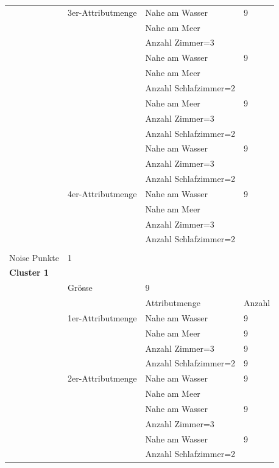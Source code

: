 \begin{longtable}{ | l | l | l | l |}
	& 3er-Attributmenge & \tabitem Nahe am Wasser & 9 \\
	& & \tabitem Nahe am Meer & \\ 
	& & \tabitem Anzahl Zimmer=3 & \\ \cline{3-4} 
	& & \tabitem Nahe am Wasser & 9 \\
	& & \tabitem Nahe am Meer & \\ 
	& & \tabitem Anzahl Schlafzimmer=2 & \\ \cline{3-4}
	& & \tabitem Nahe am Meer & 9 \\
	& & \tabitem Anzahl Zimmer=3 & \\ 
	& & \tabitem Anzahl Schlafzimmer=2 & \\ \cline{3-4}
	& & \tabitem Nahe am Wasser & 9 \\
	& & \tabitem Anzahl Zimmer=3 & \\ 
	& & \tabitem Anzahl Schlafzimmer=2 & \\ \cline{2-4}
	
	& 4er-Attributmenge & \tabitem Nahe am Wasser & 9 \\
	& & \tabitem Nahe am Meer & \\ 
	& & \tabitem Anzahl Zimmer=3 & \\ 
	& & \tabitem Anzahl Schlafzimmer=2 & \\ \hline
	
	\rowcolor{tableheadcolor}
	\multicolumn{4}{|l|}{\bfseries Tatsächliches Resultat} \\ \hline 
	Noise Punkte & \multicolumn{3}{|l|}{1} \\ \hline 
	
	\multicolumn{4}{|l|}{\textbf{Cluster 1}} \\ \cline{2-4} 
	& Grösse & \multicolumn{2}{|l|}{9} \\ \cline{2-4} 
	&& Attributmenge & Anzahl \\ \cline{2-4} 
	
	& 1er-Attributmenge & \tabitem Nahe am Wasser & 9 \\ \cline{3-4} 
	& & \tabitem Nahe am Meer & 9 \\ \cline{3-4} 
	& & \tabitem Anzahl Zimmer=3 & 9 \\ \cline{3-4} 
	& & \tabitem Anzahl Schlafzimmer=2 & 9 \\ \cline{2-4} 
	
	& 2er-Attributmenge & \tabitem Nahe am Wasser & 9 \\
	& & \tabitem Nahe am Meer & \\ \cline{3-4} 
	& & \tabitem Nahe am Wasser & 9 \\
	& & \tabitem Anzahl Zimmer=3 & \\ \cline{3-4} 
	& & \tabitem Nahe am Wasser & 9 \\
	& & \tabitem Anzahl Schlafzimmer=2 & \\ \cline{3-4} 
	

\end{longtable}

